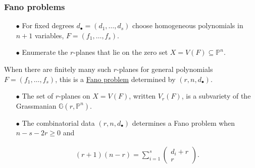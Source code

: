 \documentclass{beamer}
\newcommand{\blue}[1]{{\color{black!10!blue}\underline{#1}}}
\begin{document}
\begin{frame}
\frametitle{Fano problems}
\begin{enumerate}
\item[$\bullet$] For fixed degrees $d_\bullet = (d_1,\dotsc,d_s)$ choose homogeneous polynomials in $n+1$ variables, $F = (f_1,\dotsc,f_s)$.

\item[$\bullet$] Enumerate the $r$-planes that lie on the zero set $X = V(F)\subseteq\mathbb{P}^n$.
\end{enumerate}

When there are finitely many such $r$-planes for general polynomials $F = (f_1,\dotsc,f_s)$, this is a \blue{Fano problem} determined by $(r,n,d_\bullet)$.

\begin{enumerate}
\pause

\item[$\bullet$] The set of $r$-planes on $X=V(F)$, written $V_r(F)$, is a subvariety of the Grassmanian $\mathbb{G}(r,\mathbb{P}^n)$.

\pause

\item[$\bullet$] The combinatorial data $(r,n,d_\bullet)$ determines a Fano problem when $n-s-2r\ge 0$ and

\vspace{-.8cm}

\begin{align*}
(r+1)(n-r) = \sum_{i=1}^s \left(\begin{smallmatrix}d_i + r\\r\end{smallmatrix}\right).
\end{align*}
\end{enumerate}

\end{frame}
\end{document}
